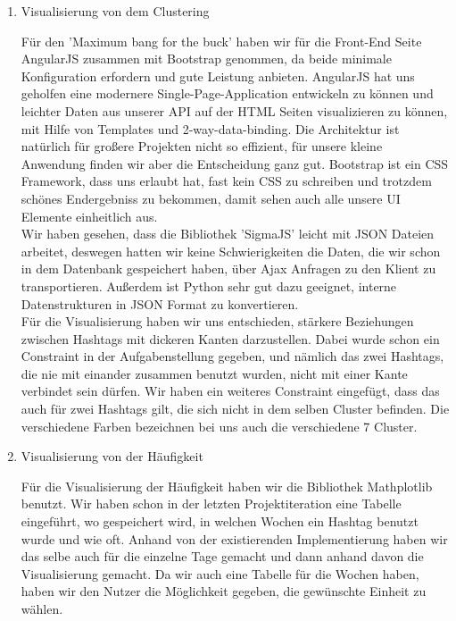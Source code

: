 \begin{enumerate}

\item Visualisierung von dem Clustering

Für den 'Maximum bang for the buck' haben wir für die Front-End Seite AngularJS zusammen mit Bootstrap genommen, da beide minimale Konfiguration erfordern und gute Leistung anbieten. AngularJS hat uns geholfen eine modernere Single-Page-Application entwickeln zu können und leichter Daten aus unserer API auf der HTML Seiten visualizieren zu können, mit Hilfe von Templates und 2-way-data-binding. Die Architektur ist natürlich für großere Projekten nicht so effizient, für unsere kleine Anwendung finden wir aber die Entscheidung ganz gut. Bootstrap ist ein CSS Framework, dass uns erlaubt hat, fast kein CSS zu schreiben und trotzdem schönes Endergebniss zu bekommen, damit sehen auch alle unsere UI Elemente einheitlich aus. \\

Wir haben gesehen, dass die Bibliothek 'SigmaJS' leicht mit JSON Dateien arbeitet, deswegen hatten wir keine Schwierigkeiten die Daten, die wir schon in dem Datenbank gespeichert haben, über Ajax Anfragen zu den Klient zu transportieren. Außerdem ist Python sehr gut dazu geeignet, interne Datenstrukturen in JSON Format zu konvertieren. \\ 

Für die Visualisierung haben wir uns entschieden, stärkere Beziehungen zwischen Hashtags mit dickeren Kanten darzustellen. Dabei wurde schon ein Constraint in der Aufgabenstellung gegeben, und nämlich das zwei Hashtags, die nie mit einander zusammen benutzt wurden, nicht mit einer Kante verbindet sein dürfen. Wir haben ein weiteres Constraint eingefügt, dass das auch für zwei Hashtags gilt, die sich nicht in dem selben Cluster befinden. Die verschiedene Farben bezeichnen bei uns auch die verschiedene 7 Cluster.

\item Visualisierung von der Häufigkeit

Für die Visualisierung der Häufigkeit haben wir die Bibliothek Mathplotlib benutzt. Wir haben schon in der letzten Projektiteration eine Tabelle eingeführt, wo gespeichert wird, in welchen Wochen ein Hashtag benutzt wurde und wie oft. Anhand von der existierenden Implementierung haben wir das selbe auch für die einzelne Tage gemacht und dann anhand davon die Visualisierung gemacht. Da wir auch eine Tabelle für die Wochen haben, haben wir den Nutzer die Möglichkeit gegeben, die gewünschte Einheit zu wählen.


\end{enumerate}
